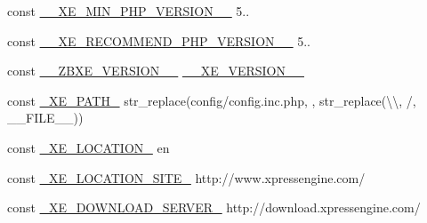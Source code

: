 \begin{DoxyCompactItemize}
\item 
const \hyperlink{config_8inc_8php_a9efd2b40fddf6f5bdc89660de1492f93}{\+\_\+\+\_\+\+X\+E\+\_\+\+M\+I\+N\+\_\+\+P\+H\+P\+\_\+\+V\+E\+R\+S\+I\+O\+N\+\_\+\+\_\+} \textquotesingle{}5..\textquotesingle{}
\item 
const \hyperlink{config_8inc_8php_a46828ee09f5bc69de2b897e3b605e9d8}{\+\_\+\+\_\+\+X\+E\+\_\+\+R\+E\+C\+O\+M\+M\+E\+N\+D\+\_\+\+P\+H\+P\+\_\+\+V\+E\+R\+S\+I\+O\+N\+\_\+\+\_\+} \textquotesingle{}5..\textquotesingle{}
\item 
const \hyperlink{config_8inc_8php_a0e70c145bf3712e075af5c3861045dc9}{\+\_\+\+\_\+\+Z\+B\+X\+E\+\_\+\+V\+E\+R\+S\+I\+O\+N\+\_\+\+\_\+} \hyperlink{config_8inc_8php_afceaaec30d0e5b6a78d0ae28bcbfc8f3}{\+\_\+\+\_\+\+X\+E\+\_\+\+V\+E\+R\+S\+I\+O\+N\+\_\+\+\_\+}
\item 
const \hyperlink{config_8inc_8php_a5387c7a3f2aa38adf16f324cee88db88}{\+\_\+\+X\+E\+\_\+\+P\+A\+T\+H\+\_\+} str\+\_\+replace(\textquotesingle{}config/config.\+inc.\+php\textquotesingle{}, \textquotesingle{}\textquotesingle{}, str\+\_\+replace(\textquotesingle{}\textbackslash{}\textbackslash{}\textquotesingle{}, \textquotesingle{}/\textquotesingle{}, \+\_\+\+\_\+\+F\+I\+L\+E\+\_\+\+\_\+))
\item 
const \hyperlink{config_8inc_8php_a7330debbfb3a027cdd5f3d3dd1dfbdd0}{\+\_\+\+X\+E\+\_\+\+L\+O\+C\+A\+T\+I\+O\+N\+\_\+} \textquotesingle{}en\textquotesingle{}
\item 
const \hyperlink{config_8inc_8php_a063bfd2eb9f811b1676d0dbc0cad2648}{\+\_\+\+X\+E\+\_\+\+L\+O\+C\+A\+T\+I\+O\+N\+\_\+\+S\+I\+T\+E\+\_\+} \textquotesingle{}http\+://www.\+xpressengine.\+com/\textquotesingle{}
\item 
const \hyperlink{config_8inc_8php_a22df32d3e0eae0d60d6cddb9ec99d5ec}{\+\_\+\+X\+E\+\_\+\+D\+O\+W\+N\+L\+O\+A\+D\+\_\+\+S\+E\+R\+V\+E\+R\+\_\+} \textquotesingle{}http\+://download.\+xpressengine.\+com/\textquotesingle{}
\item 

\end{DoxyCompactItemize}
